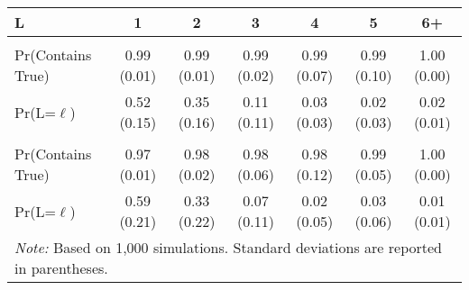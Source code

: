 
\begin{tabular}{lcccccc}
\toprule
L & 1 & 2 & 3 & 4 & 5 & 6+\\
\midrule
\addlinespace[0.3em]
\multicolumn{7}{l}{\textbf{ABE Multi}}\\
\hspace{1em}Pr(Contains True) & 0.99 (0.01) & 0.99 (0.01) & 0.99 (0.02) & 0.99 (0.07) & 0.99 (0.10) & 1.00 (0.00)\\
\hspace{1em}Pr(L=$\ell$) & 0.52 (0.15) & 0.35 (0.16) & 0.11 (0.11) & 0.03 (0.03) & 0.02 (0.03) & 0.02 (0.01)\\
\addlinespace[0.3em]
\multicolumn{7}{l}{\textbf{PRL Multi}}\\
\hspace{1em}Pr(Contains True) & 0.97 (0.01) & 0.98 (0.02) & 0.98 (0.06) & 0.98 (0.12) & 0.99 (0.05) & 1.00 (0.00)\\
\hspace{1em}Pr(L=$\ell$) & 0.59 (0.21) & 0.33 (0.22) & 0.07 (0.11) & 0.02 (0.05) & 0.03 (0.06) & 0.01 (0.01)\\
\bottomrule
\multicolumn{7}{l}{\textit{Note: } Based on 1,000 simulations. Standard deviations are reported in parentheses.}\\
\end{tabular}
